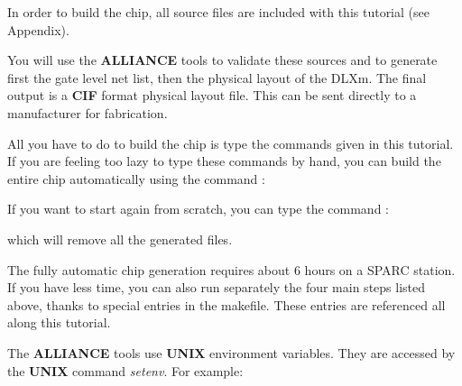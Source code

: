 In order to build the chip, all source files are included with this tutorial (see Appendix).

You will use the {\bf ALLIANCE} tools to validate these sources and to generate 
first the gate level net list, then 
the physical layout of the DLXm. The final output is a {\bf CIF} format physical layout file. This can be sent directly to a manufacturer for fabrication.

All you have to do to build the chip is type the commands given in this tutorial. If you are feeling too lazy to type these commands by hand, you can build the entire chip automatically using the command :


If you want to start again from scratch, you can type the command :


which will remove all the generated files.

The fully automatic chip generation requires about 6 hours on a SPARC station.
If you have less time, you can also run separately the four main steps listed above, thanks to special entries in the makefile.
These entries are referenced all along this tutorial.


The {\bf ALLIANCE} tools use {\bf UNIX} environment variables. They are accessed by the {\bf UNIX} command {\em setenv}. For example:



